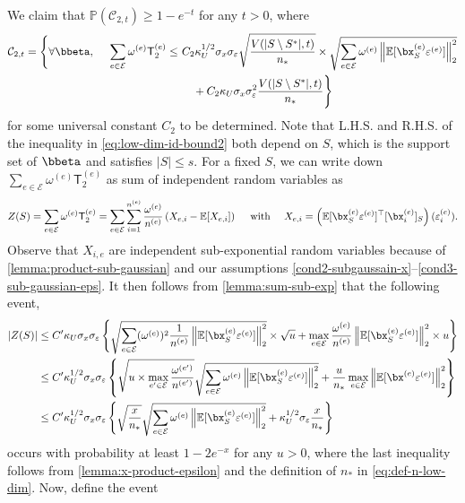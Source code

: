 \documentclass[10pt]{article}
\numberwithin{equation}{section}
\begin{document}
 We claim that $\mathbb{P}(\mathcal{C}_{2,t}) \ge 1-e^{-t}$ for any $t>0$, where
\begin{align}
\label{eq:low-dim-id-bound2}
\begin{split}
\mathcal{C}_{2,t} = \Bigg\{\forall \bbeta, ~~~~ \sum_{e\in \mathcal{E}} \omega^{(e)} \mathsf{T}_2^{(e)}  \le &~C_2 \kappa_U^{1/2} \sigma_x \sigma_\varepsilon \sqrt{\frac{V(|S\setminus S^*|,t)}{n_*}} \times \sqrt{\sum_{e\in \mathcal{E}} \omega^{(e)} \left\|\mathbb{E} [\bx_S^{(e)} \varepsilon^{(e)}]\right\|_2^2} \\
	&~~~~ + C_2 \kappa_U \sigma_x \sigma_\varepsilon^2 \frac{V(|S\setminus S^*|,t)}{n_*} \Bigg\}
\end{split}
\end{align} for some universal constant $C_2$ to be determined. Note that L.H.S. and R.H.S. of the inequality in \eqref{eq:low-dim-id-bound2} both depend on $S$, which is the support set of $\bbeta$ and satisfies $|S|\le s$. For a fixed $S$, we can write down $\sum_{e\in \mathcal{E}} \omega^{(e)} \mathsf{T}_2^{(e)}$ as sum of independent random variables as
\begin{align*}
	Z(S)=\sum_{e\in \mathcal{E}} \omega^{(e)} \mathsf{T}_2^{(e)} = \sum_{e\in \mathcal{E}} \sum_{i=1}^{n^{(e)}} \frac{\omega^{(e)}}{n^{(e)}} \left(X_{e,i} - \mathbb{E}[X_{e,i}]\right) ~~~~\text{with}~~~~ X_{e,i} = \left(\mathbb{E}[\bx_S^{(e)} \varepsilon^{(e)}]^\top [\bx_{i}^{(e)}]_S \right) (\varepsilon^{(e)}_{i}).
\end{align*}
Observe that $X_{i,e}$ are independent sub-exponential random variables because of \cref{lemma:product-sub-gaussian} and our assumptions \cref{cond2-subgaussain-x}--\ref{cond3-sub-gaussian-eps}. It then follows from \cref{lemma:sum-sub-exp} that the following event,
\begin{align*}
	|Z(S)| &\le C'\kappa_U \sigma_x \sigma_\varepsilon \left\{\sqrt{\sum_{e\in \mathcal{E}} (\omega^{(e)})^2 \frac{1}{n^{(e)}} \left\|\mathbb{E}[\bx_S^{(e)} \varepsilon^{(e)}]\right\|_2^2} \times \sqrt{u} + \max_{e\in \mathcal{E}} \frac{\omega^{(e)}}{n^{(e)}} \left\|\mathbb{E}[\bx_S^{(e)}\varepsilon^{(e)}]\right\|_2^2 \times u\right\}\\
	&\le C'\kappa_U^{1/2} \sigma_x \sigma_\varepsilon \left\{ \sqrt{u\times \max_{e'\in \mathcal{E}} \frac{\omega^{(e')}}{n^{(e')}}} \sqrt{\sum_{e\in \mathcal{E}} \omega^{(e)} \left\|\mathbb{E}[\bx_S^{(e)} \varepsilon^{(e)}]\right\|_2^2} + \frac{u}{n_*} \max_{e\in \mathcal{E}}  \left\|\mathbb{E}[\bx^{(e)}\varepsilon^{(e)}]\right\|_2^2 \right\} \\
	&\le C'\kappa_U^{1/2} \sigma_x \sigma_\varepsilon \left\{ \sqrt{\frac{x}{n_*}} \sqrt{\sum_{e\in \mathcal{E}} \omega^{(e)} \left\|\mathbb{E}[\bx_S^{(e)} \varepsilon^{(e)}]\right\|_2^2}  + \kappa_U^{1/2} \sigma_\varepsilon \frac{x}{n_*} \right\}
\end{align*} occurs with probability at least $1-2e^{-x}$ for any $u>0$, where the last inequality follows from \cref{lemma:x-product-epsilon} and the definition of $n_*$ in \eqref{eq:def-n-low-dim}. Now, define the event 
\end{document}
